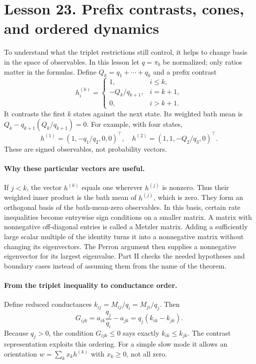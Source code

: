 \documentclass[11pt]{article}
\begin{document}
\clearpage
\section*{Lesson 23. Prefix contrasts, cones, and ordered dynamics}
To understand what the triplet restrictions still control, it helps to
change basis in the space of observables. In this lesson let $q=\pi_b$ be
normalized; only ratios matter in the formulas. Define $Q_k=q_1+\cdots+q_k$
and a prefix contrast
\[
h^{(k)}_i=\begin{cases}
1,&i\leq k,\\
-Q_k/q_{k+1},&i=k+1,\\
0,&i>k+1.
\end{cases}
\]
It contrasts the first $k$ states against the next state. Its weighted
bath mean is $Q_k-q_{k+1}(Q_k/q_{k+1})=0$.
For example, with four states,
\[
h^{(1)}=(1,-q_1/q_2,0,0)^\top,\quad
h^{(2)}=(1,1,-Q_2/q_3,0)^\top.
\]
These are signed observables, not probability vectors.

\paragraph{Why these particular vectors are useful.}
If $j<k$, the vector $h^{(k)}$ equals one wherever $h^{(j)}$ is nonzero.
Thus their weighted inner product is the bath mean of $h^{(j)}$, which is
zero. They form an orthogonal basis of the bath-mean-zero observables.
In this basis, certain rate inequalities become entrywise sign conditions
on a smaller matrix. A matrix with nonnegative off-diagonal entries is
called a Metzler matrix. Adding a sufficiently large scalar multiple of
the identity turns it into a nonnegative matrix without changing its
eigenvectors. The Perron argument then supplies a nonnegative eigenvector
for its largest eigenvalue. Part II checks the needed hypotheses and
boundary cases instead of assuming them from the name of the theorem.

\paragraph{From the triplet inequality to conductance order.}
Define reduced conductances $k_{ij}=M_{ij}/q_i=M_{ji}/q_j$. Then
\[
G_{ijk}=a_{ik}\frac{q_j}{q_i}-a_{jk}
=q_j(k_{ik}-k_{jk}).
\]
Because $q_j>0$, the condition $G_{ijk}\leq0$ says exactly
$k_{ik}\leq k_{jk}$. The contrast representation exploits this ordering.
For a simple slow mode it allows an orientation
$w=\sum_k x_k h^{(k)}$ with $x_k\geq0$, not all zero.
\end{document}
